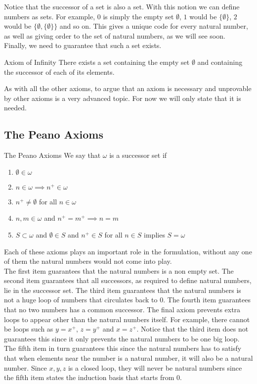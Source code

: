 \documentclass[a4paper]{article}
\begin{document}
Notice that the successor of a set is also a set. With this notion we can define numbers as sets. For example, $0$ is simply the empty set $\emptyset$, $1$ would be $\{\emptyset\}$, $2$ would be $\{\emptyset,\{\emptyset\}\}$ and so on. This gives a unique code for every natural number, as well as giving order to the set of natural numbers, as we will see soon. \\

Finally, we need to guarantee that such a set exists. 

\begin{axm}{Axiom of Infinity}{} There exists a set containing the empty set $\emptyset$ and containing the successor of each of its elements. 
\end{axm}

As with all the other axioms, to argue that an axiom is necessary and unprovable by other axioms is a very advanced topic. For now we will only state that it is needed. 

\subsection{The Peano Axioms}
\begin{defn}{The Peano Axioms}{} We say that $\omega$ is a successor set if
\begin{enumerate}
\item $\emptyset\in\omega$
\item $n\in\omega\implies n^+\in\omega$
\item $n^+\neq\emptyset$ for all $n\in\omega$
\item $n,m\in\omega$ and $n^+=m^+\implies n=m$
\item $S\subset\omega$ and $\emptyset\in S$ and $n^+\in S$ for all $n\in S$ implies $S=\omega$
\end{enumerate}
\end{defn}

Each of these axioms plays an important role in the formulation, without any one of them the natural numbers would not come into play. \\

The first item guarantees that the natural numbers is a non empty set. The second item guarantees that all successors, as required to define natural numbers, lie in the successor set. The third item guarantees that the natural numbers is not a huge loop of numbers that circulates back to $0$. The fourth item guarantees that no two numbers has a common successor. The final axiom prevents extra loops to appear other than the natural numbers itself. For example, there cannot be loops such as $y=x^+$, $z=y^+$ and $x=z^+$. Notice that the third item does not guarantees this since it only prevents the natural numbers to be one big loop. The fifth item in turn guarantees this since the natural numbers has to satisfy that when elements near the number is a natural number, it will also be a natural number. Since $x,y,z$ is a closed loop, they will never be natural numbers since the fifth item states the induction basis that starts from $0$. \\
\end{document}
